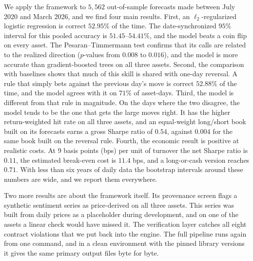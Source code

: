 \documentclass[preprint,12pt,authoryear,a4paper]{elsarticle}
\begin{document}
We apply the framework to $5{,}562$ out-of-sample forecasts made between July 2020
and March 2026, and we find four main results. First, an $\ell_2$-regularized
logistic regression is correct $52.95\%$ of the time. The date-synchronized $95\%$
interval for this pooled accuracy is $51.45$--$54.41\%$, and the model beats a coin
flip on every asset. The Pesaran--Timmermann test confirms that its calls are
related to the realized direction ($p$-values from $0.008$ to $0.016$), and the
model is more accurate than gradient-boosted trees on all three assets. Second, the
comparison with baselines shows that much of this skill is shared with one-day
reversal. A rule that simply bets against the previous day's move is correct
$52.88\%$ of the time, and the model agrees with it on $71\%$ of asset-days. Third,
the model is different from that rule in magnitude. On the days where the two
disagree, the model tends to be the one that gets the large moves right. It has the
higher return-weighted hit rate on all three assets, and an equal-weight long/short
book built on its forecasts earns a gross Sharpe ratio of $0.54$, against $0.004$
for the same book built on the reversal rule. Fourth, the economic result is
positive at realistic costs. At 9 basis points (bps) per unit of turnover the net
Sharpe ratio is $0.11$, the estimated break-even cost is $11.4$ bps, and a
long-or-cash version reaches $0.71$. With less than six years of daily data the
bootstrap intervals around these numbers are wide, and we report them everywhere.

Two more results are about the framework itself. Its provenance screen flags a
synthetic sentiment series as price-derived on all three assets. This series was
built from daily prices as a placeholder during development, and on one of the
assets a linear check would have missed it. The verification layer catches all eight
contract violations that we put back into the engine. The full pipeline runs again
from one command, and in a clean environment with the pinned library versions it
gives the same primary output files byte for byte.
\end{document}
